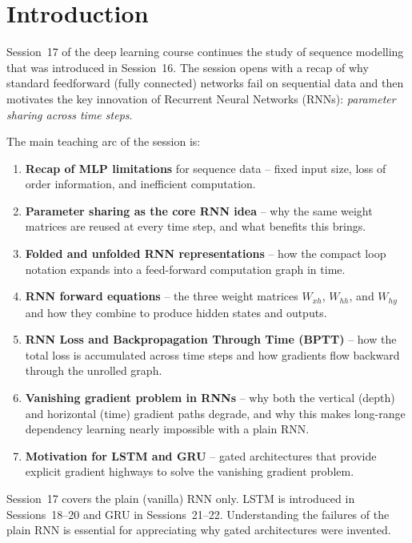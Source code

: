 \documentclass[12pt,a4paper]{article}
\newcommand{\Whh}{W_{hh}}
\newcommand{\Wxh}{W_{xh}}
\newcommand{\Why}{W_{hy}}
\begin{document}
\section{Introduction}
\label{sec:introduction}

Session~17 of the deep learning course continues the study of sequence
modelling that was introduced in Session~16.  The session opens with a recap of
why standard feedforward (fully connected) networks fail on sequential data and
then motivates the key innovation of Recurrent Neural Networks (RNNs):
\emph{parameter sharing across time steps}.

The main teaching arc of the session is:

\begin{enumerate}[label=\arabic*.]
  \item \textbf{Recap of MLP limitations} for sequence data --
        fixed input size, loss of order information, and inefficient
        computation.
  \item \textbf{Parameter sharing as the core RNN idea} -- why the same weight
        matrices are reused at every time step, and what benefits this brings.
  \item \textbf{Folded and unfolded RNN representations} -- how the compact
        loop notation expands into a feed-forward computation graph in time.
  \item \textbf{RNN forward equations} -- the three weight matrices
        $\Wxh$, $\Whh$, and $\Why$ and how they combine to produce hidden
        states and outputs.
  \item \textbf{RNN Loss and Backpropagation Through Time (BPTT)} -- how the
        total loss is accumulated across time steps and how gradients flow
        backward through the unrolled graph.
  \item \textbf{Vanishing gradient problem in RNNs} -- why both the vertical
        (depth) and horizontal (time) gradient paths degrade, and why this
        makes long-range dependency learning nearly impossible with a plain RNN.
  \item \textbf{Motivation for LSTM and GRU} -- gated architectures that
        provide explicit gradient highways to solve the vanishing gradient
        problem.
\end{enumerate}

\begin{keyinsight}[title=Session Roadmap]
Session~17 covers the plain (vanilla) RNN only.  LSTM is introduced in
Sessions~18--20 and GRU in Sessions~21--22.  Understanding the failures of the
plain RNN is essential for appreciating why gated architectures were invented.
\end{keyinsight}
\end{document}
